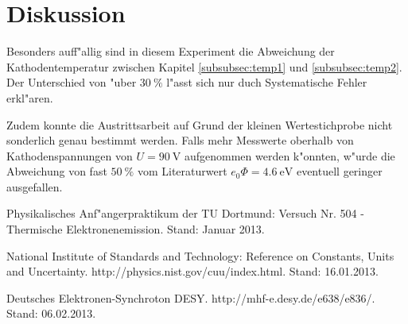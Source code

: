\section{Diskussion}
	\label{diskussion}
	Besonders auff"allig sind in diesem Experiment die Abweichung der Kathodentemperatur zwischen Kapitel \ref{subsubsec:temp1} und \ref{subsubsec:temp2}.
	Der Unterschied von "uber $\SI{30}{\percent}$ l"asst sich nur duch Systematische Fehler erkl"aren.

	Zudem konnte die Austrittsarbeit auf Grund der kleinen Wertestichprobe nicht sonderlich genau bestimmt werden.
	Falls mehr Messwerte oberhalb von Kathodenspannungen von $U = \SI{90}{\volt}$ aufgenommen werden k"onnten, w"urde die Abweichung von fast $\SI{50}{\percent}$ vom Literaturwert $e_0 \Phi = \SI{4.6}{\electronvolt}$ \cite{desy} eventuell geringer ausgefallen.

\begin{thebibliography}{9}
	 Physikalisches Anf"angerpraktikum der TU Dortmund: Versuch Nr. 504 - Thermische Elektronenemission. Stand: Januar 2013.

	 National Institute of Standards and Technology: Reference on Constants, Units and Uncertainty. http://physics.nist.gov/cuu/index.html. Stand: 16.01.2013.

	 Deutsches Elektronen-Synchroton DESY. http://mhf-e.desy.de/e638/e836/. Stand: 06.02.2013.
\end{thebibliography}
